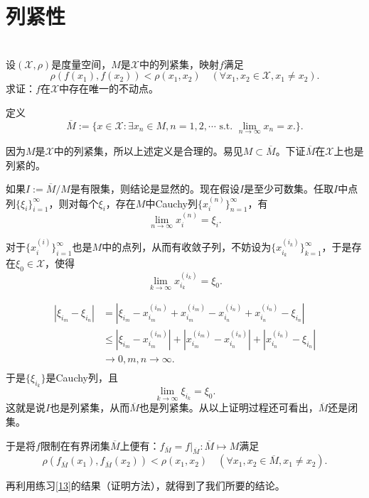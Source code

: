 \section{列紧性}
\begin{exercise}
\hfill\\
设$(\mathscr{X},\rho)$是度量空间，$M$是$\mathscr{X}$中的列紧集，映射$f$满足
$$\rho(f(x_1),f(x_2))<\rho(x_1,x_2)\quad(\forall x_1,x_2\in\mathscr{X},x_1\neq x_2).$$
求证：$f$在$\mathscr{X}$中存在唯一的不动点。

定义
$$\overline{M}:=\{x\in\mathscr{X}:\exists x_n\in M,n=1,2,\cdots\text{ s.t. }\lim_{n\rightarrow\infty}x_n=x.\}.$$

因为$M$是$\mathscr{X}$中的列紧集，所以上述定义是合理的。易见$M\subset\overline{M}$。下证$\overline{M}$在$\mathscr{X}$上也是列紧的。

如果$I:=\overline{M}/M$是有限集，则结论是显然的。现在假设$I$是至少可数集。任取$I$中点列$\{\xi_i\}_{i=1}^{\infty}$，则对每个$\xi_i$，存在$M$中Cauchy列$\{x_i^{(n)}\}_{n=1}^{\infty}$，有
$$\lim_{n\rightarrow\infty}x_i^{(n)}=\xi_i.$$


对于$\{x_i^{(i)}\}_{i=1}^{\infty}$也是$M$中的点列，从而有收敛子列，不妨设为$\{x_{i_k}^{(i_k)}\}_{k=1}^{\infty}$，于是存在$\xi_0\in\mathscr{X}$，使得
$$\lim_{k\rightarrow\infty}x_{i_k}^{(i_k)}=\xi_0.$$

\begin{align*}
|\xi_{i_m}-\xi_{i_n}|&=|\xi_{i_m}-x_{i_m}^{(i_m)}+x_{i_m}^{(i_m)}-x_{i_n}^{(i_n)}+x_{i_n}^{(i_n)}-\xi_{i_n}|\\
&\leq|\xi_{i_m}-x_{i_m}^{(i_m)}|+|x_{i_m}^{(i_m)}-x_{i_n}^{(i_n)}|+|x_{i_n}^{(i_n)}-\xi_{i_n}|\\
&\rightarrow0,m,n\rightarrow\infty.\\
\end{align*}
于是$\{\xi_{i_k}\}$是Cauchy列，且
$$\lim_{k\rightarrow\infty}\xi_{i_k}=\xi_0.$$
这就是说$I$也是列紧集，从而$\overline{M}$也是列紧集。从以上证明过程还可看出，$\overline{M}$还是闭集。

于是将$f$限制在有界闭集$\overline{M}$上便有：$f_{\overline{M}}=f|_{\overline{M}}:\overline{M}\mapsto M$满足
$$\rho(f_{\overline{M}}(x_1),f_{\overline{M}}(x_2))<\rho(x_1,x_2)\quad(\forall x_1,x_2\in\overline{M},x_1\neq x_2).$$

再利用练习\ref{13}的结果（证明方法），就得到了我们所要的结论。
\end{exercise}
\hfill\\
